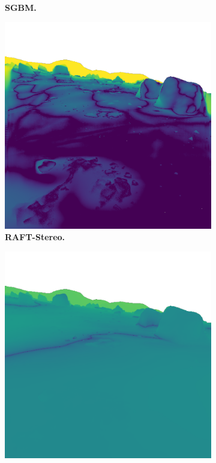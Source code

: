 \begin{figure}[b!]
\begin{subfigure}[b]{0.16\textwidth}
		\caption{\bfseries SGBM.}
	\end{subfigure}\hfill
	\begin{subfigure}[b]{0.16\textwidth}
		\includegraphics[width=\textwidth]{figures/depth_error_RAFTStereo.png}
		\caption{\bfseries RAFT-Stereo.}
	\end{subfigure}\hfill
	\begin{subfigure}[b]{0.16\textwidth}
		\includegraphics[width=\textwidth]{figures/depth_error_Depth Anything V2 (small).png}

\end{subfigure}
\end{figure}
